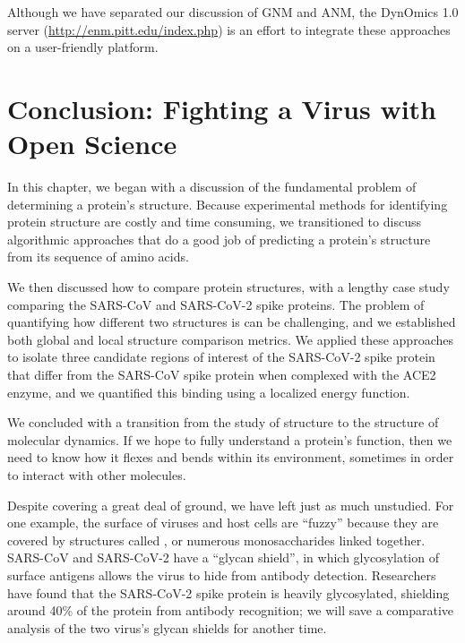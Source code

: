 Although we have separated our discussion of GNM and ANM, the DynOmics 1.0 server (\url{http://enm.pitt.edu/index.php}) is an effort to integrate these approaches on a user-friendly platform. 

\FloatBarrier
{}
\section{Conclusion: Fighting a Virus with Open Science}

In this chapter, we began with a discussion of the fundamental problem of determining a protein's structure. Because experimental methods for identifying protein structure are costly and time consuming, we transitioned to discuss algorithmic approaches that do a good job of predicting a protein's structure from its sequence of amino acids.

We then discussed how to compare protein structures, with a lengthy case study comparing the SARS-CoV and SARS-CoV-2 spike proteins. The problem of quantifying how different two structures is can be challenging, and we established both global and local structure comparison metrics. We applied these approaches to isolate three candidate regions of interest of the SARS-CoV-2 spike protein that differ from the SARS-CoV spike protein when complexed with the ACE2 enzyme, and we quantified this binding using a localized energy function.

We concluded with a transition from the study of structure to the structure of molecular dynamics. If we hope to fully understand a protein's function, then we need to know how it flexes and bends within its environment, sometimes in order to interact with other molecules.

Despite covering a great deal of ground, we have left just as much unstudied. For one example, the surface of viruses and host cells are ``fuzzy'' because they are covered by structures called , or numerous monosaccharides linked together. SARS-CoV and SARS-CoV-2 have a “glycan shield”, in which glycosylation of surface antigens allows the virus to hide from antibody detection. Researchers have found that the SARS-CoV-2 spike protein is heavily glycosylated, shielding around 40\% of the protein from antibody recognition; we will save a comparative analysis of the two virus's glycan shields for another time.

